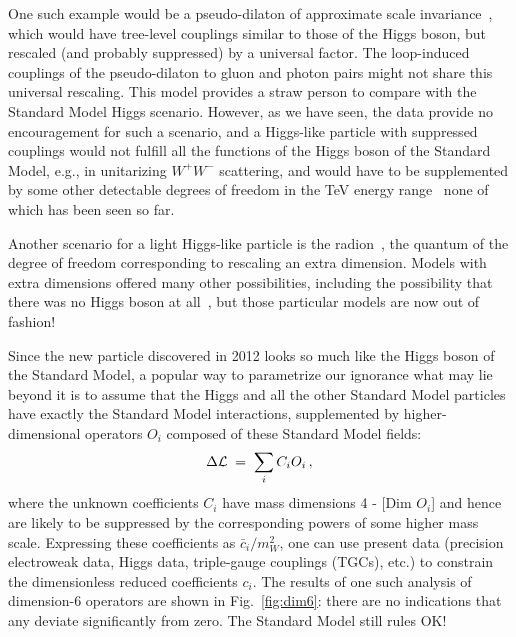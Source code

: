 \documentclass[12pt]{article}
\newcommand{\beq}{\begin{equation}}
\newcommand{\eeq}{\end{equation}}
\numberwithin{equation}{section}
\begin{document}
One such example would be a pseudo-dilaton of approximate scale invariance~\cite{pseudoD}, which
would have tree-level couplings similar to those of the Higgs boson, but rescaled (and probably suppressed) by a
universal factor. The loop-induced couplings of the pseudo-dilaton to gluon and photon pairs might not share
this universal rescaling. This model provides a straw person to compare with the Standard
Model Higgs scenario. However, as we have seen, the data provide no encouragement for
such a scenario, and a Higgs-like
particle with suppressed couplings would not fulfill all the functions of the Higgs boson of the
Standard Model, e.g., in unitarizing $W^+ W^-$ scattering, and would have to be supplemented by
some other detectable degrees of freedom in the TeV energy range~\cite{G} none of which has been seen so far.

Another scenario for a light Higgs-like particle is the radion~\cite{radion}, the quantum of the degree of
freedom corresponding to rescaling an extra dimension. Models with extra dimensions offered
many other possibilities, including the possibility that there was no Higgs boson at all~\cite{Higgsless},
but those particular models are now out of fashion!

Since the new particle discovered in 2012 looks so much like the Higgs boson of the Standard Model,
a popular way to parametrize our ignorance what may lie beyond it
is to assume that the Higgs and all the other Standard Model particles have exactly the
Standard Model interactions, supplemented by higher-dimensional operators $O_i$ composed of these
Standard Model fields:
\beq
\Delta {\cal L} \; = \; \sum_i C_i O_i \, ,
\label{dim6}
\eeq
where the unknown coefficients $C_i$ have mass dimensions 4 - [Dim $O_i$] and hence are likely
to be suppressed by the corresponding powers of some higher mass scale. Expressing these
coefficients as ${\bar c}_i/m_W^2$, one can use present data (precision electroweak data, Higgs
data, triple-gauge couplings (TGCs), etc.) to constrain the dimensionless reduced coefficients $c_i$.
The results of one such analysis of dimension-6 operators are shown in Fig.~\ref{fig:dim6}: there are no indications that
any deviate significantly from zero. The Standard Model still rules OK!
\end{document}
